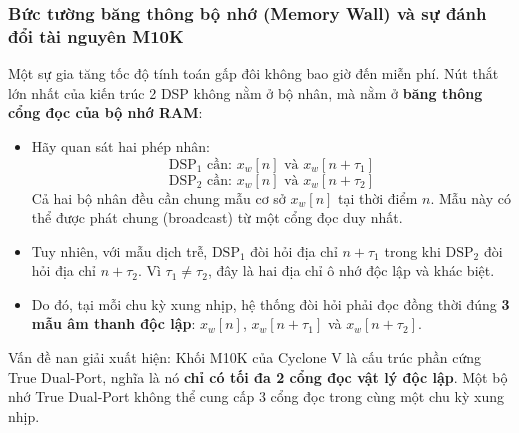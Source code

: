 \subsubsection*{Bức tường băng thông bộ nhớ (Memory Wall) và sự đánh đổi tài nguyên M10K}
Một sự gia tăng tốc độ tính toán gấp đôi không bao giờ đến miễn phí. Nút thắt lớn nhất của kiến trúc 2 DSP không nằm ở bộ nhân, mà nằm ở \textbf{băng thông cổng đọc của bộ nhớ RAM}:
\begin{itemize}[leftmargin=1.5em, itemsep=2pt]
    \item Hãy quan sát hai phép nhân:
    \begin{equation}
    \text{DSP}_1 \text{ cần: } x_w[n] \text{ và } x_w[n+\tau_1]
    \end{equation}
    \begin{equation}
    \text{DSP}_2 \text{ cần: } x_w[n] \text{ và } x_w[n+\tau_2]
    \end{equation}
    Cả hai bộ nhân đều cần chung mẫu cơ sở $x_w[n]$ tại thời điểm $n$. Mẫu này có thể được phát chung (broadcast) từ một cổng đọc duy nhất.
    \item Tuy nhiên, với mẫu dịch trễ, $\text{DSP}_1$ đòi hỏi địa chỉ $n+\tau_1$ trong khi $\text{DSP}_2$ đòi hỏi địa chỉ $n+\tau_2$. Vì $\tau_1 \ne \tau_2$, đây là hai địa chỉ ô nhớ độc lập và khác biệt.
    \item Do đó, tại mỗi chu kỳ xung nhịp, hệ thống đòi hỏi phải đọc đồng thời đúng \textbf{3 mẫu âm thanh độc lập}: $x_w[n]$, $x_w[n+\tau_1]$ và $x_w[n+\tau_2]$.
\end{itemize}

Vấn đề nan giải xuất hiện: Khối M10K của Cyclone V là cấu trúc phần cứng True Dual-Port, nghĩa là nó \textbf{chỉ có tối đa 2 cổng đọc vật lý độc lập}. Một bộ nhớ True Dual-Port không thể cung cấp 3 cổng đọc trong cùng một chu kỳ xung nhịp.

